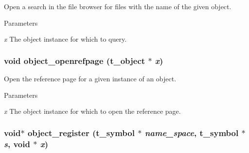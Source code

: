 Open a search in the file browser for files with the name of the given object. 
\begin{DoxyParams}{Parameters}
\item[{\em x}]The object instance for which to query. \end{DoxyParams}
\hypertarget{group__obj_gabcf7aaca1f307e806e38100355cc97ac}{
\subsubsection[{object\_\-openrefpage}]{\setlength{\rightskip}{0pt plus 5cm}void object\_\-openrefpage ({\bf t\_\-object} $\ast$ {\em x})}}
\label{group__obj_gabcf7aaca1f307e806e38100355cc97ac}


Open the reference page for a given instance of an object. 
\begin{DoxyParams}{Parameters}
\item[{\em x}]The object instance for which to open the reference page. \end{DoxyParams}
\hypertarget{group__obj_gaaa97beba179d6aebd3f3ede1b5c781fa}{
\subsubsection[{object\_\-register}]{\setlength{\rightskip}{0pt plus 5cm}void$\ast$ object\_\-register ({\bf t\_\-symbol} $\ast$ {\em name\_\-space}, \/  {\bf t\_\-symbol} $\ast$ {\em s}, \/  void $\ast$ {\em x})}}
\label{group__obj_gaaa97beba179d6aebd3f3ede1b5c781fa}


